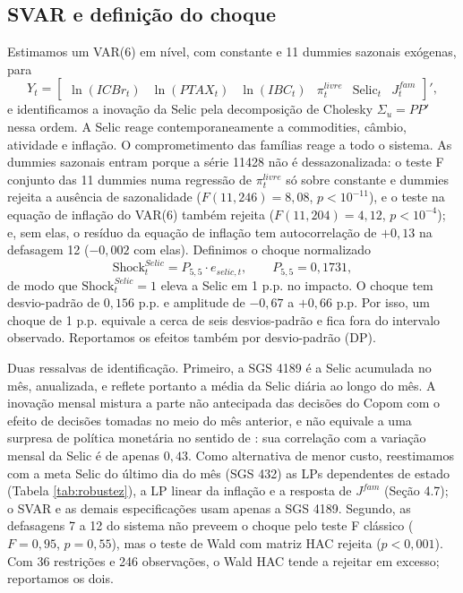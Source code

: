 \documentclass[12pt,a4paper]{article}
\begin{document}
\subsection{SVAR e definição do choque}

Estimamos um VAR(6) em nível, com constante e 11 dummies sazonais exógenas, para
\begin{equation}
Y_t = \begin{bmatrix} \ln(ICBr_t) & \ln(PTAX_t) & \ln(IBC_t) & \pi_t^{livre} & \text{Selic}_t & J_t^{fam} \end{bmatrix}',
\end{equation}
e identificamos a inovação da Selic pela decomposição de Cholesky $\Sigma_u = PP'$ nessa ordem. A Selic reage contemporaneamente a commodities, câmbio, atividade e inflação. O comprometimento das famílias reage a todo o sistema. As dummies sazonais entram porque a série 11428 não é dessazonalizada: o teste F conjunto das 11 dummies numa regressão de $\pi_t^{livre}$ só sobre constante e dummies rejeita a ausência de sazonalidade ($F(11, 246) = 8{,}08$, $p < 10^{-11}$), e o teste na equação de inflação do VAR(6) também rejeita ($F(11, 204) = 4{,}12$, $p < 10^{-4}$); e, sem elas, o resíduo da equação de inflação tem autocorrelação de $+0{,}13$ na defasagem 12 ($-0{,}002$ com elas). Definimos o choque normalizado
\begin{equation}
\text{Shock}_t^{Selic} = P_{5,5} \cdot e_{selic,t}, \qquad P_{5,5} = 0{,}1731,
\label{eq:shock_norm}
\end{equation}
de modo que $\text{Shock}_t^{Selic} = 1$ eleva a Selic em 1 p.p. no impacto. O choque tem desvio-padrão de $0{,}156$ p.p. e amplitude de $-0{,}67$ a $+0{,}66$ p.p. Por isso, um choque de 1 p.p. equivale a cerca de seis desvios-padrão e fica fora do intervalo observado. Reportamos os efeitos também por desvio-padrão (DP).

Duas ressalvas de identificação. Primeiro, a SGS 4189 é a Selic acumulada no mês, anualizada, e reflete portanto a média da Selic diária ao longo do mês. A inovação mensal mistura a parte não antecipada das decisões do Copom com o efeito de decisões tomadas no meio do mês anterior, e não equivale a uma surpresa de política monetária no sentido de \citet{nakamura2018high}: sua correlação com a variação mensal da Selic é de apenas $0{,}43$. Como alternativa de menor custo, reestimamos com a meta Selic do último dia do mês (SGS 432) as LPs dependentes de estado (Tabela \ref{tab:robustez}), a LP linear da inflação e a resposta de $J^{fam}$ (Seção 4.7); o SVAR e as demais especificações usam apenas a SGS 4189. Segundo, as defasagens 7 a 12 do sistema não preveem o choque pelo teste F clássico ($F = 0{,}95$, $p = 0{,}55$), mas o teste de Wald com matriz HAC rejeita ($p < 0{,}001$). Com 36 restrições e 246 observações, o Wald HAC tende a rejeitar em excesso; reportamos os dois.
\end{document}
